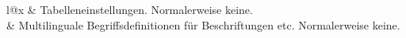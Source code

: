\begin{longtable}{l@{\extracolsep{8pt}}x}
     & Tabelleneinstellungen.
                                                 Normalerweise keine.\\
      & Multilinguale Begriffsdefinitionen für Beschriftungen etc.
																				         Normalerweise keine.\\
\bottomrule%
\end{longtable}%